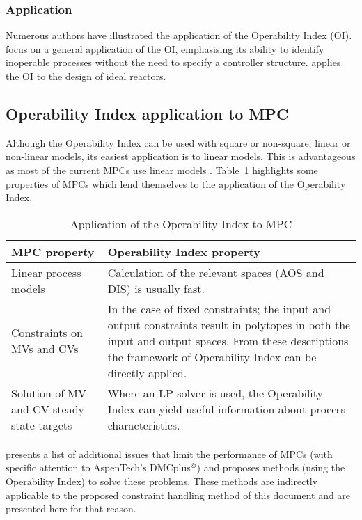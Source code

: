 \subsubsection{Application}
Numerous authors have illustrated the application of the Operability Index (OI). 
\citet{opconproc} focus on a general application of the OI, emphasising its ability to identify inoperable processes without the need to specify a controller structure. 
\citet{opidealrx} applies the OI to the design of ideal reactors. 

\subsection{Operability Index application to MPC}
Although the  Operability Index can be used with square or non-square, linear or non-linear models, its easiest application is to linear models. 
This is advantageous as most of the current MPCs use linear models \citep{vinsonphd}.
Table~\ref{tab:mpcoi} highlights some properties of MPCs which lend themselves to the  application of the Operability Index.%
%
\begin{table}[htbp]
  \centering
  \caption[Application of the Operability Index to MPC]{Application of the
    Operability Index to MPC \citep{vinsonphd}}
  \label{tab:mpcoi}
    \begin{tabular}{p{6cm} p{9cm}}
      \toprule
      MPC property & Operability Index property \\
      \midrule
      Linear process models & Calculation of the relevant spaces (AOS and DIS) is usually fast.\\[1.3ex]
      Constraints on MVs and CVs & In the case of fixed constraints; the input and output constraints result in polytopes in both the input and output spaces. 
From these descriptions the framework of Operability Index can be directly applied.\\[1.3ex]
      Solution of MV and CV steady state targets  & Where an LP solver is used, the Operability Index can yield useful information about process characteristics.\\
      \bottomrule
    \end{tabular}
\end{table}

\citet{vinsonphd} presents a list of additional issues that limit the performance of MPCs (with specific attention to AspenTech's DMCplus$^{\copyright}$) and proposes methods (using the Operability Index) to solve these problems. 
These methods are indirectly applicable to the proposed constraint handling method of this document and are presented here for that reason. 

